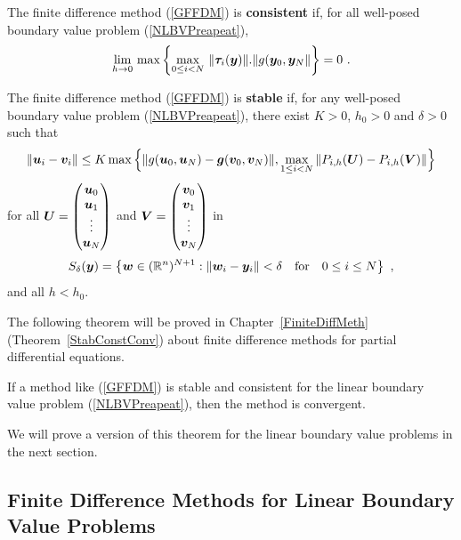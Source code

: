 \begin{defn}
The finite difference method (\ref{GFFDM}) is
{\bfseries consistent} if, for all
well-posed boundary value problem (\ref{NLBVPreapeat}),
\[
\lim_{h \rightarrow 0}\, \max\left\{
\max_{0 \leq i < N} \, \| \bm{\tau}_i(\bm{y}) \| .
\| g(\bm{y}_0, \bm{y}_N \| \right\} = 0 \ .
\]
\end{defn}

\begin{defn}
The finite difference method (\ref{GFFDM}) is
{\bfseries stable} if, for any
well-posed boundary value problem (\ref{NLBVPreapeat}), there exist
$K>0$, $h_0 >0$ and $\delta>0$ such that
\begin{equation} \label{FDMS}
\| \bm{u}_i - \bm{v}_i \| \leq
K \max \Big\{ \| g(\bm{u}_0,\bm{u}_N) -
\bm{g}(\bm{v}_0,\bm{v}_N) \| ,
\max_{1\leq i < N} \| P_{i,h}(\bm{U}) - P_{i,h}(\bm{V}) \| \Big\}
\end{equation}
for all
$\displaystyle \bm{U} =
\begin{pmatrix} \bm{u}_0 \\ \bm{u}_1 \\ \vdots \\ \bm{u}_N \end{pmatrix}$
and
$\displaystyle \bm{V} =
\begin{pmatrix} \bm{v}_0 \\ \bm{v}_1 \\ \vdots \\ \bm{v}_N \end{pmatrix}$
in
\[
S_\delta(\bm{y}) = \left\{ \bm{w} \in (\mathbb{R}^n)^{N+1} :
\| \bm{w}_i - \bm{y}_i \| < \delta
\quad \text{for} \quad 0 \leq i \leq N \right\} \ ,
\]
and all $h < h_0$.
\end{defn}

The following theorem will be proved in Chapter~\ref{FiniteDiffMeth}
(Theorem~\ref{StabConstConv}) about finite difference methods for
partial differential equations.

\begin{theorem}
If a method like (\ref{GFFDM}) is stable and consistent for the
linear boundary value problem (\ref{NLBVPreapeat}), then the method is
convergent.
\label{SCssiC}
\end{theorem}

We will prove a version of this theorem for the linear boundary value
problems in the next section.

\subsection{Finite Difference Methods for Linear Boundary Value
Pro\-blems}

